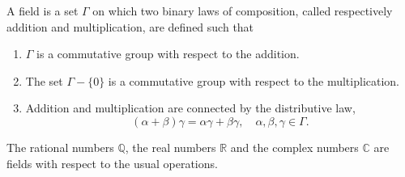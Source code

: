 A field is a set $\Gamma$ on which two binary laws of composition, called respectively addition and multiplication, are defined such that

\begin{enumerate}
\item $\Gamma$ is a commutative group with respect to the addition.
\item The set $\Gamma - \{0\}$ is a commutative group with respect to the multiplication.
\item Addition and multiplication are connected by the distributive law,
$$(\alpha + \beta)\gamma = \alpha \gamma + \beta \gamma, \quad \alpha, \beta, \gamma \in \Gamma.$$
\end{enumerate}

The rational numbers $\mathbb{Q}$, the real numbers $\mathbb{R}$ and the complex numbers $\mathbb{C}$ are fields with respect to the usual operations.
